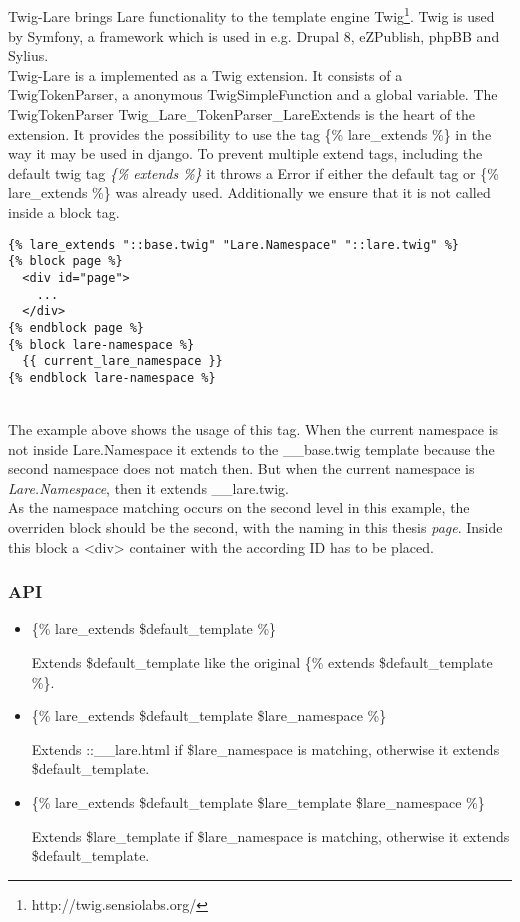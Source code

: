 \subsection{\twigLare{}}
Twig-Lare brings Lare functionality to the template engine Twig\footnote{http://twig.sensiolabs.org/}.
Twig is used by Symfony, a framework which is used in e.g. Drupal 8, eZPublish, phpBB and Sylius.
\\
Twig-Lare is a implemented as a Twig extension.
It consists of a TwigTokenParser, a anonymous TwigSimpleFunction and a global variable.
The TwigTokenParser Twig\_Lare\_TokenParser\_LareExtends is the heart of the extension.
It provides the possibility to use the tag \{\% lare\_extends \%\} in the way it may be used in django.
To prevent multiple extend tags, including the default twig tag \emph{\{\% extends \%\}} it throws a Error if either the default tag or \{\% lare\_extends \%\} was already used.
Additionally we ensure that it is not called inside a block tag.

\begin{minipage}[c]{0.95\linewidth}
\begin{lstlisting}[caption=Example Lare Template, label=example_lare_template]
{% lare_extends "::base.twig" "Lare.Namespace" "::lare.twig" %}
{% block page %}
  <div id="page">
    ...
  </div>
{% endblock page %}
{% block lare-namespace %}
  {{ current_lare_namespace }}
{% endblock lare-namespace %}
\end{lstlisting}
\end{minipage}
\\
The example above shows the usage of this tag.
When the current namespace is not inside Lare.Namespace it extends to the \:\:\_\_base.twig template because the second namespace does not match then.
But when the current namespace is \emph{Lare.Namespace}, then it extends \:\:\_\_lare.twig.
\\
As the namespace matching occurs on the second level in this example, the overriden block should be the second, with the naming in this thesis \emph{page}.
Inside this block a <div> container with the according ID has to be placed.

\subsubsection{API}

\begin{itemize}
\item \{\% lare\_extends \$default\_template \%\}

Extends \$default\_template like the original \{\% extends \$default\_template \%\}.
\item \{\% lare\_extends \$default\_template \$lare\_namespace \%\}

Extends ::\_\_lare.html if \$lare\_namespace is matching, otherwise it extends \$default\_template.
\item \{\% lare\_extends \$default\_template \$lare\_template \$lare\_namespace \%\}

Extends \$lare\_template if \$lare\_namespace is matching, otherwise it extends \$default\_template.
\end{itemize}


